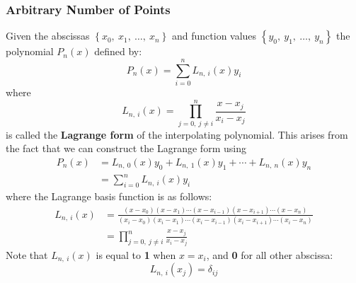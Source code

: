 \documentclass{article}
\begin{document}
\subsubsection{Arbitrary Number of Points}
Given the abscissas \(\left\{ x_0,\: x_1,\: \dots,\: x_n \right\}\) and
function values \(\left\{ y_0,\: y_1,\: \dots,\: y_n \right\}\) the
polynomial \(P_n\left( x \right)\) defined by:
\begin{equation*}
    P_n\left( x \right) = \sum_{i = 0}^n L_{n,\: i}\left( x \right) y_i
\end{equation*}
where
\begin{equation*}
    L_{n,\: i}\left( x \right) = \prod_{j = 0,\: j \neq i}^n \frac{x - x_j}{x_i - x_j}
\end{equation*}
is called the \textbf{Lagrange form} of the interpolating polynomial.
This arises from the fact that we can construct the Lagrange form using
\begin{align*}
    P_n\left( x \right) & = L_{n,\: 0}\left( x \right) y_0 + L_{n,\: 1}\left( x \right) y_1 + \cdots + L_{n,\: n}\left( x \right) y_n \\
                        & = \sum_{i = 0}^n L_{n,\: i}\left( x \right) y_i
\end{align*}
where the Lagrange basis function is as follows:
\begin{align*}
    L_{n,\: i}\left( x \right) & = \frac{\left( x - x_0 \right)\left( x - x_1 \right) \cdots \left( x - x_{i - 1} \right) \left( x - x_{i + 1} \right) \cdots \left( x - x_n \right)}{\left( x_i - x_0 \right)\left( x_i - x_1 \right) \cdots \left( x_i - x_{i - 1} \right) \left( x_i - x_{i + 1} \right) \cdots \left( x_i - x_n \right)} \\
                               & = \prod_{j = 0,\: j \neq i}^n \frac{x - x_j}{x_i - x_j}
\end{align*}
Note that \(L_{n,\: i}\left( x \right)\) is equal to \textbf{1} when \(x = x_i\), and \textbf{0} for all other abscissa:
\begin{equation*}
    L_{n,\: i}\left( x_j \right) = \delta_{ij}
\end{equation*}
\end{document}
